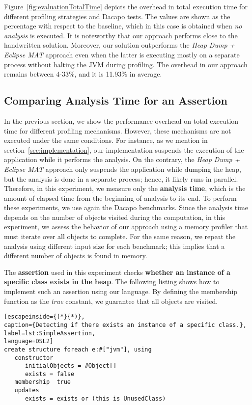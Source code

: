 Figure~\ref{fig:evaluationTotalTime} depicts the overhead in total execution time for different profiling strategies and Dacapo tests.
The values are shown as the percentage with respect to the baseline, which in this case is obtained when \textit{no analysis} is executed.
It is noteworthy that our approach performs close to the handwritten solution.
Moreover, our solution outperforms the \textit{Heap Dump + Eclipse MAT} approach even when the latter is executing mostly on a separate process without halting the JVM during profiling.
The overhead in our approach remains between 4-33\%, and it is 11.93\% in average.

\subsection{Comparing Analysis Time for an Assertion}

In the previous section, we show the performance overhead on total execution time for different profiling mechanisms.
However, these mechanisms are not executed under the same conditions.
For instance, as we mention in section~\ref{sec:implementation}, our implementation suspends the execution of the application while it performs the analysis.
On the contrary, the \textit{Heap Dump + Eclipse MAT} approach only suspends the application while dumping the heap, but the analysis is done in a separate process; hence, it likely runs in parallel.
Therefore, in this experiment, we measure only the \textbf{analysis time}, which is the amount of elapsed time from the beginning of analysis to its end.
To perform these experiments, we use again the Dacapo benchmarks.
Since the analysis time depends on the number of objects visited during the computation, in this experiment, we assess the behavior of our approach using a memory profiler that must iterate over all objects to complete.
For the same reason, we repeat the analysis using different input size for each benchmark; this implies that a different number of objects is found in memory.

The \textbf{assertion} used in this experiment checks \textbf{whether an instance of a specific class exists in the heap}.
The following listing shows how to implement such an assertion using our language.
By defining the membership function as the \textit{true} constant, we guarantee that all objects are visited.

\begin{lstlisting}[escapeinside={(*}{*)},
caption={Detecting if there exists an instance of a specific class.}, 
label=lst:SimpleAssertion,
language=DSL2]
create structure foreach e:#["jvm"], using
   constructor
      initialObjects = #Object[]
      exists = false
   membership  true
   updates
      exists = exists or (this is UnusedClass)
\end{lstlisting}

